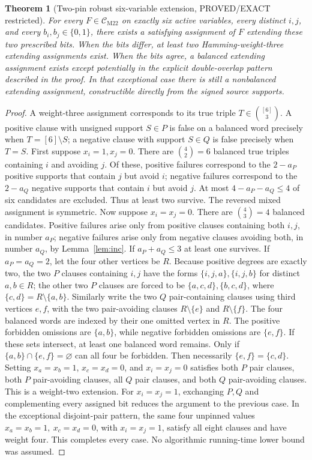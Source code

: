 \documentclass[11pt]{article}
\newtheorem{theorem}{Theorem}
\newcommand{\CM}{\mathcal C_{\mathrm{M22}}}
\begin{document}
\begin{theorem}[Two-pin robust six-variable extension, PROVED/EXACT restricted]\label{th:two}
For every \(F\in\CM\) on exactly six active variables, every distinct \(i,j\), and every \(b_i,b_j\in\{0,1\}\), there exists a satisfying assignment of \(F\) extending these two prescribed bits. When the bits differ, at least \emph{two} Hamming-weight-three extending assignments exist. When the bits agree, a balanced extending assignment exists except potentially in the explicit double-overlap pattern described in the proof. In that exceptional case there is still a nonbalanced extending assignment, constructible directly from the signed source supports.
\end{theorem}
\begin{proof}
A weight-three assignment corresponds to its true triple \(T\in{[6]\choose3}\). A positive clause with unsigned support \(S\in P\) is false on a balanced word precisely when \(T=[6]\setminus S\); a negative clause with support \(S\in Q\) is false precisely when \(T=S\).
First suppose \(x_i=1,x_j=0\). There are \(\binom42=6\) balanced true triples containing \(i\) and avoiding \(j\). Of these, positive failures correspond to the \(2-a_P\) positive supports that contain \(j\) but avoid \(i\); negative failures correspond to the \(2-a_Q\) negative supports that contain \(i\) but avoid \(j\). At most \(4-a_P-a_Q\le4\) of six candidates are excluded. Thus at least two survive. The reversed mixed assignment is symmetric.
Now suppose \(x_i=x_j=0\). There are \(\binom43=4\) balanced candidates. Positive failures arise only from positive clauses containing both \(i,j\), in number \(a_P\); negative failures arise only from negative clauses avoiding both, in number \(a_Q\), by Lemma~\ref{lem:inc}. If \(a_P+a_Q\le3\) at least one survives. If \(a_P=a_Q=2\), let the four other vertices be \(R\). Because positive degrees are exactly two, the two \(P\) clauses containing \(i,j\) have the forms \(\{i,j,a\},\{i,j,b\}\) for distinct \(a,b\in R\); the other two \(P\) clauses are forced to be \(\{a,c,d\},\{b,c,d\}\), where \(\{c,d\}=R\setminus\{a,b\}\). Similarly write the two \(Q\) pair-containing clauses using third vertices \(e,f\), with the two pair-avoiding clauses \(R\setminus\{e\}\) and \(R\setminus\{f\}\).
The four balanced words are indexed by their one omitted vertex in \(R\). The positive forbidden omissions are \(\{a,b\}\), while negative forbidden omissions are \(\{e,f\}\). If these sets intersect, at least one balanced word remains. Only if \(\{a,b\}\cap\{e,f\}=\varnothing\) can all four be forbidden. Then necessarily \(\{e,f\}=\{c,d\}\). Setting \(x_a=x_b=1\), \(x_c=x_d=0\), and \(x_i=x_j=0\) satisfies both \(P\) pair clauses, both \(P\) pair-avoiding clauses, all \(Q\) pair clauses, and both \(Q\) pair-avoiding clauses. This is a weight-two extension.
For \(x_i=x_j=1\), exchanging \(P,Q\) and complementing every assigned bit reduces the argument to the previous case. In the exceptional disjoint-pair pattern, the same four unpinned values \(x_a=x_b=1,\ x_c=x_d=0\), with \(x_i=x_j=1\), satisfy all eight clauses and have weight four. This completes every case. No algorithmic running-time lower bound was assumed.
\end{proof}
\end{document}
